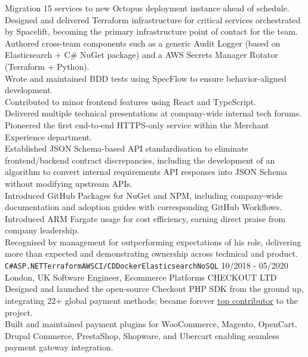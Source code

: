 \documentclass[9pt]{lib/developercv} %
\begin{document}
\begin{entrylist}
{			Migration 15 services to new Octopus deployment instance ahead of schedule.\\
			Designed and delivered Terraform infrastructure for critical services orchestrated by Spacelift, becoming the primary infrastructure point of contact for the team.\\
			Authored cross-team components such as a generic Audit Logger (based on Elasticsearch + C\# NuGet package) and a AWS Secrets Manager Rotator (Terraform + Python).\\
			Wrote and maintained BDD tests using SpecFlow to ensure behavior-aligned development.\\
			Contributed to minor frontend features using React and TypeScript.\\
			Delivered multiple technical presentations at company-wide internal tech forums.\\
			Pioneered the first end-to-end HTTPS-only service within the Merchant Experience department.\\
			Established JSON Schema-based API standardisation to eliminate frontend/backend contract discrepancies, including the development of an algorithm to convert internal requirements API responses into JSON Schema without modifying upstream APIs.\\
			Introduced GitHub Packages for NuGet and NPM, including company-wide documentation and adoption guides with corresponding GitHub Workflows.\\
			Introduced ARM Fargate usage for cost efficiency, earning direct praise from company leadership.\\
			Recognised by management for outperforming expectations of his role, delivering more than expected and demonstrating ownership across technical and product.\\
			\texttt{C\#}\slashsep\texttt{ASP.NET}\slashsep\texttt{Terraform}\slashsep\texttt{AWS}\slashsep\texttt{CI/CD}\slashsep\texttt{Docker}\slashsep\texttt{Elasticsearch}\slashsep\texttt{NoSQL}
		}
	\entry
		{10/2018 - 05/2020\\\footnotesize{London, UK}}
		{Software Engineer, Ecommerce Platforms}
		{CHECKOUT LTD}
		{
			Designed and launched the open-source Checkout PHP SDK from the ground up, integrating 22+ global payment methods; became forever \href{https://github.com/checkout/checkout-sdk-php/graphs/contributors}{\underline{top contributor}} to the project.\\
			Built and maintained payment plugins for WooCommerce, Magento, OpenCart, Drupal Commerce, PrestaShop, Shopware, and Ubercart enabling seamless payment gateway integration.\\
}
\end{entrylist}
\end{document}
